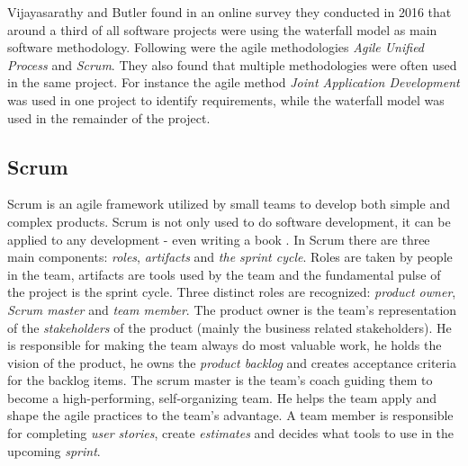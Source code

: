Vijayasarathy and Butler \cite{vijayasarathy2016choice} found in an online
survey they conducted in 2016 that around a third of all software projects were
using the waterfall model as main software methodology. Following were the
agile methodologies \textit{Agile Unified Process} and \textit{Scrum}. They
also found that multiple methodologies were often used in the same project.
For instance the agile method \textit{Joint Application Development} was used
in one project to identify requirements, while the waterfall model was used in
the remainder of the project.

\subsection{Scrum}

Scrum is an agile framework utilized by small teams to develop both simple and
complex products. Scrum is not only used to do software development, it can be
applied to any development - even writing a book \cite{sims2012scrum}. In Scrum
there are three main components: \textit{roles}, \textit{artifacts} and
\textit{the sprint cycle}. Roles are taken by people in the team, artifacts are
tools used by the team and the fundamental pulse of the project is the sprint
cycle. Three distinct roles are recognized: \textit{product owner},
\textit{Scrum master} and \textit{team member}. The product owner is the team's
representation of the \textit{stakeholders} of the product (mainly the business
related stakeholders). He is responsible for making the team always do most
valuable work, he holds the vision of the product, he owns the \textit{product
backlog} and creates acceptance criteria for the backlog items. The scrum
master is the team's coach guiding them to become a high-performing,
self-organizing team. He helps the team apply and shape the agile practices to
the team's advantage. A team member is responsible for completing \textit{user
stories}, create \textit{estimates} and decides what tools to use in the
upcoming \textit{sprint}. \cite{sims2012scrum}

